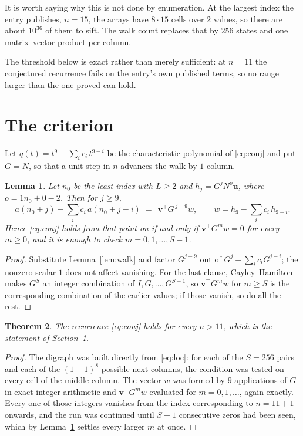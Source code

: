 \documentclass[11pt,a4paper]{article}
\theoremstyle{plain}
\newtheorem{theorem}{Theorem}
\newtheorem{lemma}[theorem]{Lemma}
\theoremstyle{definition}
\begin{document}
It is worth saying why this is not done by enumeration. At the largest index the entry
publishes, $n=15$, the arrays have $8\cdot15$ cells over
$2$ values, so there are about $10^{36}$ of them to sift. The
walk count replaces that by $256$ states and one matrix--vector product per column.

The threshold below is exact rather than merely sufficient: at $n=11$ the conjectured
recurrence fails on the entry's own published terms, so no range larger than the one proved
can hold.
\section{The criterion}

Let $q(t)=t^{9}-\sum_i c_i\,t^{9-i}$ be the characteristic polynomial of
\eqref{eq:conj} and put $G=N$, so that a unit step in $n$ advances the walk by
$1$ column.

\begin{lemma}\label{lem:crit}
Let $n_0$ be the least index with $L\ge2$ and $h_j=G^{j}N^{o}\mathbf{u}$, where
$o=1n_0+0-2$. Then for $j\ge9$,
\[
a(n_0+j)-\sum_i c_i\,a(n_0+j-i)\;=\;\,\mathbf{v}^{\!\top}G^{\,j-9}w,
\qquad w=h_{9}-\sum_i c_i\,h_{9-i} .
\]
Hence \eqref{eq:conj} holds from that point on if and only if
$\mathbf{v}^{\!\top}G^{m}w=0$ for every $m\ge0$, and it is enough to check
$m=0,1,\dots,S-1$.
\end{lemma}

\begin{proof}
Substitute Lemma~\ref{lem:walk} and factor $G^{j-9}$ out of
$G^{j}-\sum_ic_iG^{j-i}$; the nonzero scalar $1$ does not affect
vanishing. For the last clause, Cayley--Hamilton makes $G^{S}$ an integer combination of
$I,G,\dots,G^{S-1}$, so $\mathbf{v}^{\!\top}G^{m}w$ for $m\ge S$ is the corresponding
combination of the earlier values; if those vanish, so do all the rest.
\end{proof}

\begin{theorem}
The recurrence \eqref{eq:conj} holds for every $n>11$, which is the statement of
Section~1.
\end{theorem}

\begin{proof}
The digraph was built directly from \eqref{eq:loc}: for each of the $S=256$ pairs and each
of the $(1+1)^{8}$ possible next columns, the condition was tested on every cell of
the middle column. The vector $w$ was formed by $9$ applications of $G$ in exact integer
arithmetic and $\mathbf{v}^{\!\top}G^{m}w$ evaluated for $m=0,1,\dots$, again exactly.
Every one of those integers vanishes from the index corresponding to $n=11+1$ onwards,
and the run was continued until $S+1$ consecutive zeros had been seen, which by
Lemma~\ref{lem:crit} settles every larger $m$ at once.
\end{proof}
\end{document}
